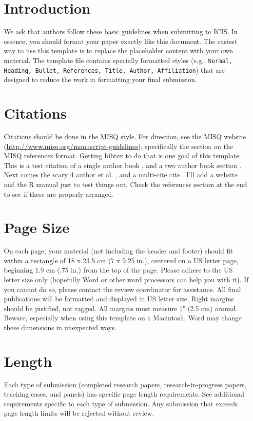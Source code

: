\documentclass{icisfinal}
\begin{document}
\section{Introduction}

We ask that authors follow these basic guidelines when submitting to ICIS. In
essence, you should format your paper exactly like this document. The easiest
way to use this template is to replace the placeholder content with your own
material. The template file contains specially formatted styles (e.g.,
\texttt{Normal, Heading, Bullet, References, Title, Author, Affiliation}) that
are designed to reduce the work in formatting your final submission.

\section{Citations}

Citations should be done in the MISQ style. For direction, see the MISQ website
(\url{http://www.misq.org/manuscript-guidelines}), specifically the section on the
MISQ references format. Getting bibtex to do that is one goal of this
template. This is a test citation of a single author book
\autocite{bonini_simulation_1963}, and a two author book section
\autocite{chenhall_formal_1989}. Next comes the scary 4 author et
al. \autocite{zhang2006}, and a multi-cite cite \autocite{bonini_simulation_1963,
  ackoff_management_1961}.  I'll add a website \autocite{Ahlers2013} and the R manual
\autocite{R2014} just to test things out. Check the references section at the end to see if
these are properly arranged.

\section{Page Size}
On each page, your material (not including the header and footer) should fit
within a rectangle of 18 x 23.5 cm (7 x 9.25 in.), centered on a US letter page,
beginning 1.9 cm (.75 in.) from the top of the page.  Please adhere to the US
letter size only (hopefully Word or other word processors can help you with
it). If you cannot do so, please contact the review coordinator for
assistance. All final publications will be formatted and displayed in US letter
size. Right margins should be justified, not ragged. All margins must measure 1"
(2.5 cm) around. Beware, especially when using this template on a Macintosh,
Word may change these dimensions in unexpected ways.

\section{Length}
Each type of submission (completed research papers, research-in-progress papers,
teaching cases, and panels) has specific page length requirements. See
additional requirements specific to each type of submission. Any submission that
exceeds page length limits will be rejected without review.
\end{document}
